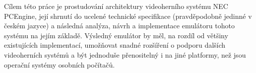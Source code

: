 Cílem této práce je prostudování architektury videoherního systému NEC
PCEngine, její shrnutí do ucelené technické specifikace (pravděpodobně jedinné
v českém jazyce) a následná analýza, návrh a implementace emulátoru tohoto
systému na jejím základě. Výsledný emulátor by měl, na rozdíl od většiny
existujících implementací, umožňovat snadné rozšíření o podporu dalších
videoherních systémů a být jednoduše přenositelný i na jiné platformy, než
jsou operační systémy osobních počítačů.

\begin{comment}

Vznik a existence videoherního průmyslu jsou přirozenou reakcí výrobců
elektronických zařízení na lidskou potřebu bavit se. Historie videoher sahá až
do roku 1947, kdy bylo patentováno první \uv{zařízení} tohoto druhu - analogový
obvod implementující jednoduchou hru promítanou na stíntko osciloskopu. K
prvním komerčním úspěchům v této oblasti však vedla ještě dlouhá cesta, než v
roce 1972 společnost Atari začala vyrábět legendární videohru {\em PONG}, která
svým jednoduchým principem, provedením umožňujícím provoz na běžném televizoru
a nízkou cenou zpřístupnila tento nový druh zábavy široké veřejnosti.

Popularita a úspěch videohry {\em PONG} byly důležitým impulzem pro vznik
konceptu videoherní konzole, elektronického zařízení pro domácí zábavu. Díky
jednoduchosti obsluhy, nízkým pořizovacím nákladům a rozmanité škále žánrů
herních programů si v průběhu uplynulých 40-ti let vybudovalo 7
generací\footnote{Dělení videoherních konzolí na generace se odvíjí od velkých
technických kroků v této oblasti, jako je přechod od 8-mi bitů k 16-ti atd.,
více viz.~\cite{wwwWikiConsole}} videoherních konzolí neotřesitelné místo na
trhu.

V průběhu těchto 40-ti let také vzniklo nesčetné množství více či méně
populárních herních programů, které s příchodem nových technologií, a tedy i
videoherních konzolí nových generací, zastárly. Původní hardware nutný ke
spuštění těchto programů je v dnešní době prakticky nesehnatelný a jedinnou
možností jak se k těmto programům vrátit je emulace videoherní konzole, pro
kterou byly určeny.

Cílem této práce je nastudovat architekturu videoherní konzole NEC PCEngine a
na základě 

Vrcholu své popularity dosáhly videoherní konzole v letech 1983-1995, tedy v
době, kdy už byla běžně dostupná osobní výpočetní technika, ale v případě, že
by měla sloužit pouze jako zdroj zábavy, byla její cena stále příliš vysoká.
Dostupné technologie společně s důmyslným návrhem však umožnily přinést na
trh levné, ale přesto výkonné videoherní konzole 3. generace, které se
vyznačovaly detailní a propracovanou grafikou ve vysokém rozlišení, kvalitním
zvukovým výstupem a novými způsoby ovládání.


\end{comment}
